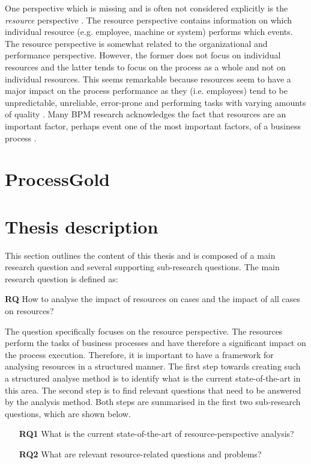 One perspective which is missing and is often not considered explicitly is the \textit{resource} perspective \cite{Zhao2015}. The resource perspective contains information on which individual resource (e.g. employee, machine or system) performs which events. The resource perspective is somewhat related to the organizational and performance perspective. However, the former does not focus on individual resources and the latter tends to focus on the process as a whole and not on individual resources. This seems remarkable because resources seem to have a major impact on the process performance as they (i.e. employees) tend to be unpredictable, unreliable, error-prone and performing tasks with varying amounts of quality \cite{Pika2015}. Many BPM research acknowledges the fact that resources are an important factor, perhaps event one of the most important factors, of a business process \cite{baccarini2004management, Pika2015,thevendran2004perception}. 


\section{ProcessGold}


\section{Thesis description}
This section outlines the content of this thesis and is composed of a main research question and several supporting sub-research questions. The main research question is defined as:

\vspace{.5cm}
\textbf{RQ} How to analyse the impact of resources on cases and the impact of all cases on resources?
\newline


The question specifically focuses on the resource perspective. The resources perform the tasks of business processes and have therefore a significant impact on the process execution. Therefore, it is important to have a framework for analysing resources in a structured manner. The first step towards creating such a structured analyse method is to identify what is the current state-of-the-art in this area. The second step is to find relevant questions that need to be answered by the analysis method. Both steps are summarised in the first two sub-research questions, which are shown below. 

\begin{enumerate}
	\item[\textbf{RQ1}] What is the current state-of-the-art of resource-perspective analysis? 
    \item[\textbf{RQ2}] What are relevant resource-related questions and problems?
\end{enumerate}

